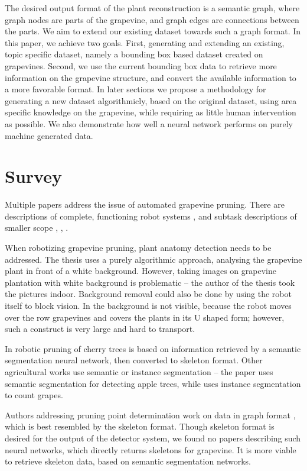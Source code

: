 \documentclass{PSAIE}%
\begin{document}
The desired output format of the plant reconstruction is a semantic graph, where graph nodes are parts
of the grapevine, and graph edges are connections between the parts. We aim to extend our existing
dataset towards such a graph format. In this paper, we achieve two goals. First, generating and
extending an existing, topic specific dataset, namely a bounding box based dataset created on grapevines.
Second, we use the current
bounding box data to retrieve more information on the grapevine structure, and convert the available
information to a more favorable format. In later sections we propose a methodology for generating a
new dataset algorithmicly, based on the original dataset, using area specific knowledge on the
grapevine, while requiring as little human intervention as possible. We also demonstrate how well a
neural network performs on purely machine generated data.

\section{Survey} \label{sec_survey}
Multiple papers address the issue of automated grapevine pruning. There are descriptions of complete,
functioning robot systems \cite{botterill2017robot}, and subtask descriptions of smaller scope
\cite{goesmannai}, \cite{fernandes2021grapevine}, \cite{katyara2020reproducible}.

When robotizing grapevine pruning, plant anatomy detection needs to be addressed. The thesis
\cite{white_background_grape} uses a purely algorithmic approach, analysing the grapevine plant
in front of a white background. However, taking images on grapevine plantation with white background
is problematic -- the author of the thesis took the pictures indoor. Background removal could also be
done by using the robot itself to block vision. In \cite{botterill2017robot} the background is not
visible, because the robot moves over the row grapevines and covers the plants in its U shaped form;
however, such a construct is very large and hard to transport.

In \cite{you2021semantics} robotic pruning of cherry trees is based on information retrieved by a
semantic segmentation neural network, then converted to skeleton format. Other
agricultural works use semantic or instance segmentation -- the paper \cite{chen2021semantic} uses semantic
segmentation for detecting apple trees, while \cite{santos2020grape} uses instance segmentation to count
grapes.

Authors addressing pruning point determination work on data in graph format \cite{goesmannai}, which is best
resembled by the skeleton format. Though skeleton format is desired for the output of the detector system,
we found no papers describing such neural networks, which directly returns skeletons for grapevine.
It is more viable to retrieve skeleton data, based on \cite{you2021semantics} semantic segmentation networks.
\end{document}
